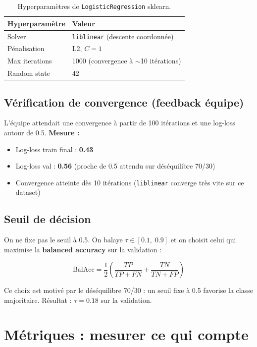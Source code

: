 \documentclass[11pt, a4paper]{article}
\begin{document}
\begin{table}[H]
\centering
\begin{tabular}{ll}
\toprule
\textbf{Hyperparamètre} & \textbf{Valeur} \\
\midrule
Solver & \texttt{liblinear} (descente coordonn\'{e}e) \\
P\'{e}nalisation & L2, $C = 1$ \\
Max iterations & 1000 (convergence \`{a} $\sim$10 it\'{e}rations) \\
Random state & 42 \\
\bottomrule
\end{tabular}
\caption{Hyperparamètres de \texttt{LogisticRegression} sklearn.}
\end{table}

\subsection{V\'{e}rification de convergence (feedback \'{e}quipe)}

L'\'{e}quipe attendait une convergence \`{a} partir de 100 it\'{e}rations et une log-loss autour de 0.5. \textbf{Mesure :}

\begin{itemize}
    \item Log-loss train final : \textbf{0.43}
    \item Log-loss val : \textbf{0.56} (proche de 0.5 attendu sur d\'{e}s\'{e}quilibre 70/30)
    \item Convergence atteinte d\`{e}s 10 it\'{e}rations (\texttt{liblinear} converge tr\`{e}s vite sur ce dataset)
\end{itemize}

\subsection{Seuil de d\'{e}cision}

On ne fixe pas le seuil \`{a} 0.5. On balaye $\tau \in [0.1,\; 0.9]$ et on choisit celui qui maximise la \textbf{balanced accuracy} sur la validation :

$$\text{BalAcc} = \frac{1}{2}\left(\frac{TP}{TP+FN} + \frac{TN}{TN+FP}\right)$$

Ce choix est motiv\'{e} par le d\'{e}s\'{e}quilibre 70/30 : un seuil fixe \`{a} 0.5 favorise la classe majoritaire. R\'{e}sultat : $\tau = 0.18$ sur la validation.

\section{M\'{e}triques : mesurer ce qui compte}
\label{sec:metrics}
\end{document}
